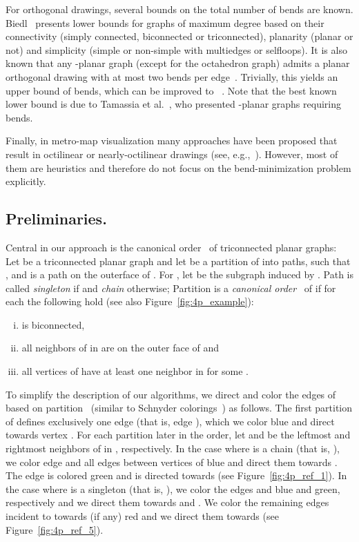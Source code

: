 \documentclass[a4paper,twoside,11pt]{article}
\begin{document}
For orthogonal drawings, several bounds on the total number of bends
are known. Biedl~\cite{Bie96} presents lower bounds for graphs of
maximum degree  based on their connectivity (simply connected,
biconnected or triconnected), planarity (planar or not) and
simplicity (simple or non-simple with multiedges or selfloops). It
is also known that any -planar graph (except for the octahedron
graph) admits a planar orthogonal drawing with at most two bends per
edge~\cite{BK94,LMS98}. Trivially, this yields an upper bound of
 bends, which can be improved to ~\cite{BK94}. Note that
the best known lower bound is due to Tamassia et al.~\cite{TTV91},
who presented -planar graphs requiring  bends.

Finally, in metro-map visualization many approaches have been
proposed that result in octilinear or nearly-octilinear drawings
(see, e.g.,~\cite{HMN06,Noellenburg05,NW11,SROW11}). However, most
of them are heuristics and therefore do not focus on the
bend-minimization problem explicitly.


\subsection{Preliminaries.}
\label{sec:preliminaries}
Central in our approach is the canonical order~\cite{FPP90,Kant92b}
of triconnected planar graphs: Let  be a triconnected
planar graph and let  be a partition of 
into paths, such that ,  and  is a path on the outerface of .
For , let  be the subgraph induced by
. Path  is called \emph{singleton} if
 and \emph{chain} otherwise;  Partition  is a
\emph{canonical order}~\cite{FPP90,Kant92b} of  if for each
 the following hold (see also
Figure~\ref{fig:4p_example}):

\begin{enumerate}[(i)] 
\item  is biconnected, 
\item all neighbors of  in  are on the outer face of
 and
\item all vertices of  have at least one neighbor in  for
some .
\end{enumerate}

To simplify the description of our algorithms, we direct and color
the edges of~ based on partition~ (similar to Schnyder
colorings~\cite{Fe04}) as follows. The first partition  of 
defines exclusively one edge (that is, edge ), which we
color blue and direct towards vertex . For each partition
 later in the order, let
 and  be the leftmost and rightmost neighbors of 
in , respectively. In the case where  is a chain (that
is, ), we color edge  and all edges between
vertices of  blue and direct them towards . The edge
 is colored green and is directed towards  (see
Figure~\ref{fig:4p_ref_1}). In the case where  is a singleton
(that is, ), we color the edges  and
 blue and green, respectively and we direct them towards
 and . We color the remaining edges incident to 
towards  (if any) red and we direct them towards 
(see Figure~\ref{fig:4p_ref_5}).
\end{document}
